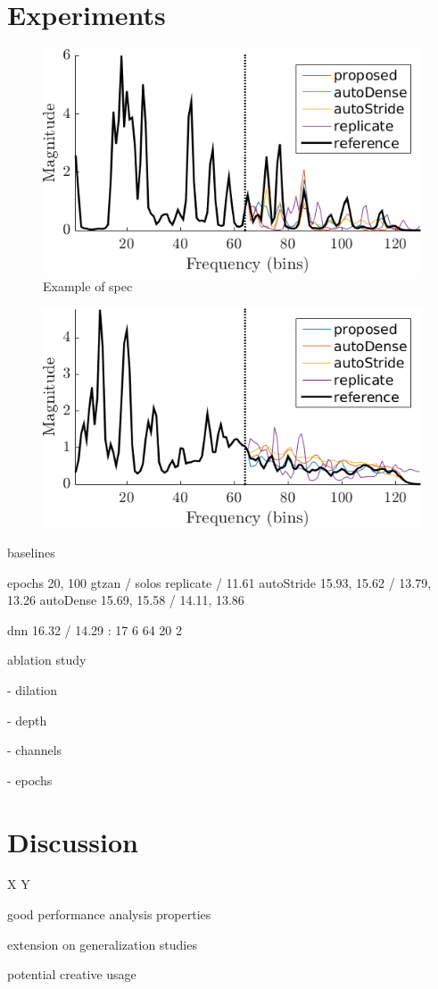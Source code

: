 \documentclass{article}
\begin{document}
\section{Experiments}
\label{sec:experiments}


\begin{figure}
\center
\includegraphics[width = .85\columnwidth]{figures/solos_1141.png}
\caption{Example of spec}
\label{fig:solos}
\end{figure}

\begin{figure}
\center
\includegraphics[width = .85\columnwidth]{figures/gtzan_1120.png}
\caption{}
\label{fig:gtzan}
\end{figure}

baselines

epochs 20, 100
gtzan / solos
replicate  / 11.61
autoStride  15.93, 15.62 / 13.79, 13.26
autoDense 15.69, 15.58 / 14.11,  13.86

dnn 16.32 / 14.29 : 17 6 64 20 2

ablation study

- dilation

- depth

- channels

- epochs


\section{Discussion}
\label{sec:discussion}

X Y

good performance analysis properties

extension on generalization studies

potential creative usage

\vfill\pagebreak




\end{document}

